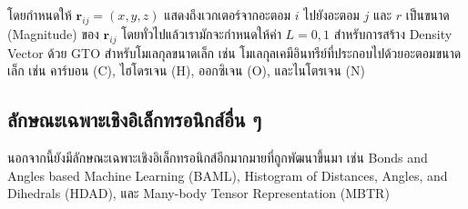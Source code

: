 \noindent โดยกำหนดให้ $\bm{r}_{ij} = (x,y,z)$ แสดงถึงเวกเตอร์จากอะตอม $i$ ไปยังอะตอม $j$ และ $r$ 
เป็นขนาด (Magnitude) ของ $\bm{r}_{ij}$ โดยทั่วไปแล้วเรามักจะกำหนดให้ค่า $L=0,1$ สำหรับการสร้าง Density Vector 
ด้วย GTO สำหรับโมเลกุลขนาดเล็ก เช่น โมเลกุลเคมีอินทรีย์ที่ประกอบไปด้วยอะตอมขนาดเล็ก เช่น คาร์บอน (C), ไฮโดรเจน (H), ออกซิเจน 
(O), และไนโตรเจน (N)\autocite{kwac2021}

\subsection{ลักษณะเฉพาะเชิงอิเล็กทรอนิกส์อื่น ๆ}
\label{ssec:other_feat_elec}

นอกจากนี้ยังมีลักษณะเฉพาะเชิงอิเล็กทรอนิกส์อีกมากมายที่ถูกพัฒนาขึ้นมา\autocite{faber2018} เช่น Bonds and Angles based Machine 
Learning (BAML)\autocite{huang2016}, Histogram of Distances, Angles, and Dihedrals (HDAD)\autocite{faber2017}, 
และ Many-body Tensor Representation (MBTR)\autocite{huo2018,langer2022}
